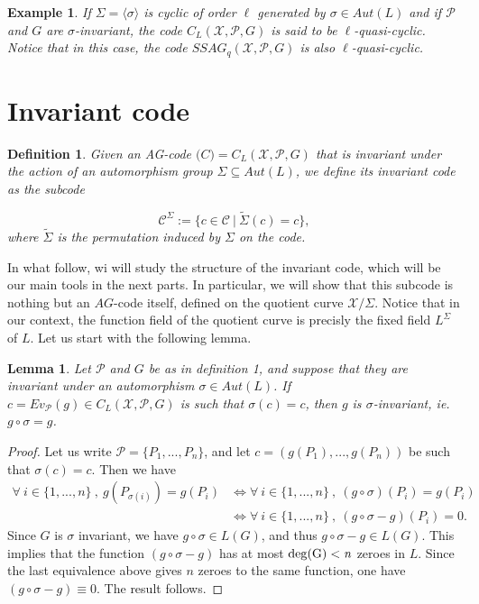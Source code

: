 \documentclass[10pt]{article}
\newtheorem{def1}{Definition}[]
\newtheorem{expl}{Example}[]
\newtheorem{lem1}{Lemma}[]
\newcommand{\s}{\vspace{0.3cm}}
\newcommand{\su}{\subseteq}
\newcommand{\X}{\mathcal{X}}
\newcommand{\PR}{\mathcal{P}}
\begin{document}
\s

\begin{expl} 
\rm If $\Sigma = \langle\sigma\rangle$ is cyclic of order $\ell$ generated by $\sigma \in Aut(L)$ and if $\PR$ and $G$ are $\sigma$-invariant, the code $C_L(\X,\PR,G)$ is said to be $\ell$-quasi-cyclic. Notice that in this case, the code $SSAG_q(\X,\PR,G)$ is also $\ell$-quasi-cyclic.
\end{expl}

\s

\section{Invariant code}

\s

\begin{def1} Given an AG-code $\mathcal(C) = C_L(\X,\PR,G)$ that is invariant under the action of an automorphism group $\Sigma \su Aut(L)$, we define its invariant code as the subcode 

\[\mathcal{C}^{\Sigma} := \{c \in \mathcal{C} \ | \ \tilde{\Sigma}(c)=c\},\]
where $\tilde{\Sigma}$ is the permutation induced by $\Sigma$ on the code.
\end{def1}
\s

In what follow, wi will study the structure of the invariant code, which will be our main tools in the next parts. In particular, we will show that this subcode is nothing but an $AG$-code itself, defined on the quotient curve $\X/\Sigma$. Notice that in our context, the function field of the quotient curve is precisly the fixed field $L^{\Sigma}$ of $L$. Let us start with the following lemma.

\s

\begin{lem1}
Let $\PR$ and $G$ be as in definition 1, and suppose that they are invariant under an automorphism $\sigma \in Aut(L)$. If $c = Ev_{\PR}(g) \in C_L(\X,\PR,G)$ is such that $\sigma(c) = c$, then $g$ is $\sigma$-invariant, ie. $g\circ \sigma = g$. 
\end{lem1}

\s

\begin{proof}
Let us write $\PR = \{P_1,...,P_n\}$, and let $c=(g(P_1),...,g(P_n))$ be such that $\sigma(c)=c$. Then we have 
\begin{align*}
\forall \ i \in \{1,...,n\} \ , \ g(P_{\sigma(i)}) = g(P_i) &\iff \forall \ i \in \{1,...,n\} \ , \ (g \circ \sigma)(P_i) =g(P_i) \\
& \iff \forall \ i \in \{1,...,n\} \ , \ (g\circ \sigma - g)(P_i) = 0.
\end{align*}
Since $G$ is $\sigma$ invariant, we have $g \circ \sigma \in L(G)$, and thus $g\circ \sigma - g \in L(G)$. This implies that the function $(g \circ \sigma - g)$ has at most $\rm{deg}(G)<\it{n}$ zeroes in $L$. Since the last equivalence above gives $n$ zeroes to the same function, one have $(g \circ \sigma - g) \equiv 0$. The result follows.
\end{proof}
\end{document}
